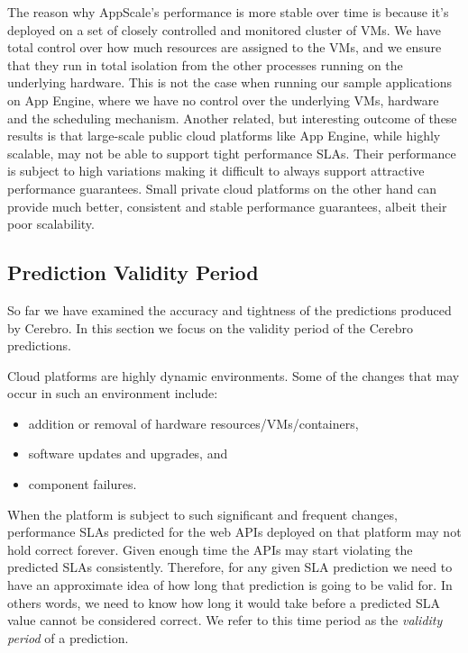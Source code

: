 The reason why AppScale's performance is more stable over time is because it's deployed on a set of closely controlled 
and monitored cluster of VMs. We have total control
over how much resources are assigned to the VMs, and we ensure that they run in total isolation from the other processes 
running on the underlying hardware.
This is not the case when running our sample applications on App Engine, where we have no control over 
the underlying VMs, hardware and the
scheduling mechanism. Another related, but interesting outcome of these results is that large-scale public cloud platforms like App Engine, while
highly scalable, may not be able to support tight performance SLAs. Their performance is subject to high variations making it difficult to always support attractive
performance guarantees. Small private cloud platforms on the other hand can provide much better, consistent and stable performance guarantees, albeit their
poor scalability. %

\subsection{Prediction Validity Period}
So far we have examined the accuracy and tightness of the predictions produced by Cerebro. In this section we 
focus on the validity period of the Cerebro predictions.

Cloud platforms are highly dynamic environments. Some of the changes that may occur in such an environment include:
\begin{itemize}
\item addition or removal of hardware resources/VMs/containers,
\item software updates and upgrades, and
\item component failures.
\end{itemize}

When the platform is subject to such significant and frequent changes, performance SLAs predicted for the web APIs deployed on that
platform may not hold correct forever. Given enough time the APIs may start violating the predicted SLAs consistently. Therefore, for any
given SLA prediction we need to have an approximate idea of how long that prediction is going to be valid for. In others words, we need
to know how long it would take before a predicted SLA value cannot be considered correct. We refer to this time period as the 
\textit{validity period} of a prediction.

